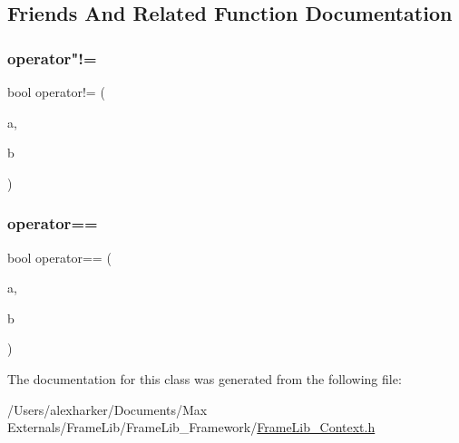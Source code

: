 \subsection{Friends And Related Function Documentation}
\mbox{\label{class_frame_lib___context_a7aed82ce3d334858032a3c45e3c70169}} 
\subsubsection{\texorpdfstring{operator"!=}{operator!=}}
{\footnotesize\ttfamily bool operator!= (\begin{DoxyParamCaption}\item[{const \hyperlink{class_frame_lib___context}{Frame\+Lib\+\_\+\+Context} \&}]{a,  }\item[{const \hyperlink{class_frame_lib___context}{Frame\+Lib\+\_\+\+Context} \&}]{b }\end{DoxyParamCaption})\hspace{0.3cm}{\ttfamily [friend]}}

\mbox{\label{class_frame_lib___context_ab0382454ba28ee3ff302be24ffc861c0}} 
\subsubsection{\texorpdfstring{operator==}{operator==}}
{\footnotesize\ttfamily bool operator== (\begin{DoxyParamCaption}\item[{const \hyperlink{class_frame_lib___context}{Frame\+Lib\+\_\+\+Context} \&}]{a,  }\item[{const \hyperlink{class_frame_lib___context}{Frame\+Lib\+\_\+\+Context} \&}]{b }\end{DoxyParamCaption})\hspace{0.3cm}{\ttfamily [friend]}}



The documentation for this class was generated from the following file\+:\begin{DoxyCompactItemize}
\item 
/\+Users/alexharker/\+Documents/\+Max Externals/\+Frame\+Lib/\+Frame\+Lib\+\_\+\+Framework/\hyperlink{_frame_lib___context_8h}{Frame\+Lib\+\_\+\+Context.\+h}\end{DoxyCompactItemize}
